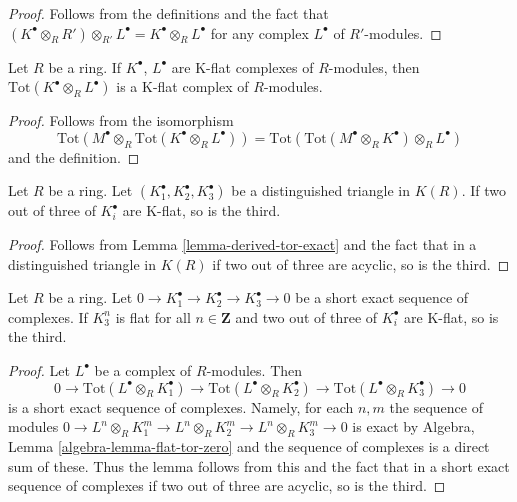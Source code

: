 \begin{proof}
Follows from the definitions and the fact that
$(K^\bullet \otimes_R R') \otimes_{R'} L^\bullet =
K^\bullet \otimes_R L^\bullet$ for any complex
$L^\bullet$ of $R'$-modules.
\end{proof}

\begin{lemma}
\label{lemma-tensor-product-K-flat}
Let $R$ be a ring. If $K^\bullet$, $L^\bullet$ are K-flat complexes
of $R$-modules, then $\text{Tot}(K^\bullet \otimes_R L^\bullet)$ is a
K-flat complex of $R$-modules.
\end{lemma}

\begin{proof}
Follows from the isomorphism
$$
\text{Tot}(M^\bullet \otimes_R \text{Tot}(K^\bullet \otimes_R L^\bullet))
=
\text{Tot}(\text{Tot}(M^\bullet \otimes_R K^\bullet) \otimes_R L^\bullet)
$$
and the definition.
\end{proof}

\begin{lemma}
\label{lemma-K-flat-two-out-of-three}
Let $R$ be a ring. Let $(K_1^\bullet, K_2^\bullet, K_3^\bullet)$ be
a distinguished triangle in $K(R)$. If two out of three
of $K_i^\bullet$ are K-flat, so is the third.
\end{lemma}

\begin{proof}
Follows from
Lemma \ref{lemma-derived-tor-exact}
and the fact that in a distinguished triangle in
$K(R)$ if two out of three are acyclic, so is the third.
\end{proof}

\begin{lemma}
\label{lemma-K-flat-two-out-of-three-ses}
Let $R$ be a ring. Let
$0 \to K_1^\bullet \to K_2^\bullet \to K_3^\bullet \to 0$ be
a short exact sequence of complexes. If $K_3^n$ is flat for
all $n \in \mathbf{Z}$ and two out of three
of $K_i^\bullet$ are K-flat, so is the third.
\end{lemma}

\begin{proof}
Let $L^\bullet$ be a complex of $R$-modules. Then
$$
0 \to
\text{Tot}(L^\bullet \otimes_R K_1^\bullet) \to
\text{Tot}(L^\bullet \otimes_R K_2^\bullet) \to
\text{Tot}(L^\bullet \otimes_R K_3^\bullet) \to 0
$$
is a short exact sequence of complexes. Namely, for each
$n, m$ the sequence of modules
$0 \to L^n \otimes_R K_1^m \to
L^n \otimes_R K_2^m \to
L^n \otimes_R K_3^m \to 0$
is exact by Algebra, Lemma \ref{algebra-lemma-flat-tor-zero}
and the sequence of complexes is a direct sum of these.
Thus the lemma follows from this
and the fact that in a short exact sequence of complexes
if two out of three are acyclic, so is the third.
\end{proof}

